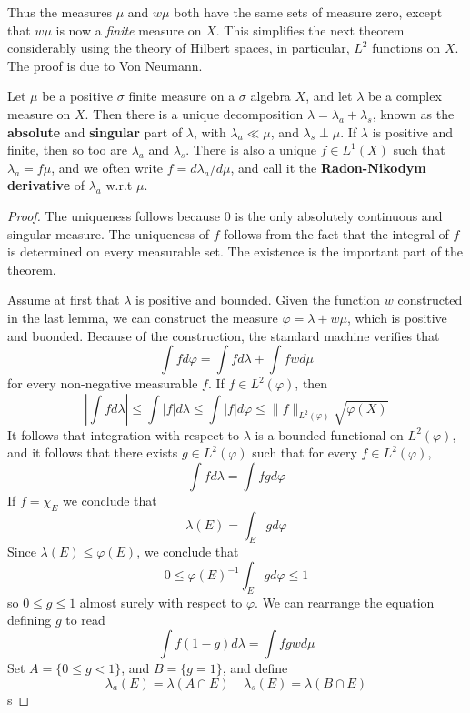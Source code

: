 Thus the measures $\mu$ and $w\mu$ both have the same sets of measure zero, except that $w\mu$ is now a {\it finite} measure on $X$. This simplifies the next theorem considerably using the theory of Hilbert spaces, in particular, $L^2$ functions on $X$. The proof is due to Von Neumann.

\begin{theorem}
    Let $\mu$ be a positive $\sigma$ finite measure on a $\sigma$ algebra $X$, and let $\lambda$ be a complex measure on $X$. Then there is a unique decomposition $\lambda = \lambda_a + \lambda_s$, known as the {\bf absolute} and {\bf singular} part of $\lambda$, with $\lambda_a \ll \mu$, and $\lambda_s \perp \mu$. If $\lambda$ is positive and finite, then so too are $\lambda_a$ and $\lambda_s$. There is also a unique $f \in L^1(X)$ such that $\lambda_a = f\mu$, and we often write $f = d\lambda_a/d\mu$, and call it the {\bf Radon-Nikodym derivative} of $\lambda_a$ w.r.t $\mu$.
\end{theorem}
\begin{proof}
    The uniqueness follows because $0$ is the only absolutely continuous and singular measure. The uniqueness of $f$ follows from the fact that the integral of $f$ is determined on every measurable set. The existence is the important part of the theorem.

    Assume at first that $\lambda$ is positive and bounded. Given the function $w$ constructed in the last lemma, we can construct the measure $\varphi = \lambda + w\mu$, which is positive and buonded. Because of the construction, the standard machine verifies that
    \[ \int f d\varphi = \int fd\lambda + \int fw d\mu \]
    for every non-negative measurable $f$. If $f \in L^2(\varphi)$, then
    \[ \left| \int f d\lambda \right| \leq \int |f| d\lambda \leq \int |f| d\varphi \leq \| f \|_{L^2(\varphi)} \sqrt{\varphi(X)} \]
    It follows that integration with respect to $\lambda$ is a bounded functional on $L^2(\varphi)$, and it follows that there exists $g \in L^2(\varphi)$ such that for every $f \in L^2(\varphi)$,
    \[ \int f d\lambda = \int fg d\varphi \]
    If $f = \chi_E$ we conclude that
    \[ \lambda(E) = \int_E gd\varphi \]
    Since $\lambda(E) \leq \varphi(E)$, we conclude that
    \[ 0 \leq \varphi(E)^{-1} \int_E gd\varphi \leq 1 \]
    so $0 \leq g \leq 1$ almost surely with respect to $\varphi$. We can rearrange the equation defining $g$ to read
    \[ \int f(1-g) d\lambda = \int fgw d\mu \]
    Set $A = \{ 0 \leq g < 1 \}$, and $B = \{ g = 1 \}$, and define
    \[ \lambda_a(E) = \lambda(A \cap E)\ \ \ \ \ \lambda_s(E) = \lambda(B \cap E) \]
    s
\end{proof}


